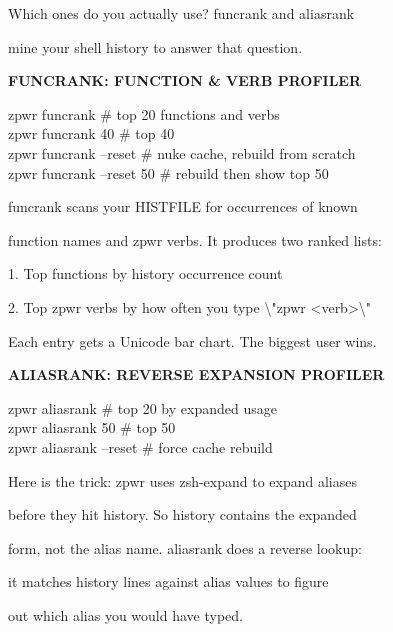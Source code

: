 \documentclass[11pt,a4paper,twoside]{book}
\begin{document}
Which ones do you actually use? funcrank and aliasrank

mine your shell history to answer that question.


\vspace{12pt}
{\bfseries\color{neonyellow} FUNCRANK: FUNCTION \& VERB PROFILER}\vspace{4pt}

\begin{codebox}
zpwr funcrank                       \# top 20 functions and verbs\\
zpwr funcrank 40                    \# top 40\\
zpwr funcrank --reset               \# nuke cache, rebuild from scratch\\
zpwr funcrank --reset 50            \# rebuild then show top 50\\
\end{codebox}

funcrank scans your HISTFILE for occurrences of known

function names and zpwr verbs. It produces two ranked lists:

1. Top functions by history occurrence count

2. Top zpwr verbs by how often you type \textbackslash{}"zpwr <verb>\textbackslash{}"

Each entry gets a Unicode bar chart. The biggest user wins.


\vspace{12pt}
{\bfseries\color{neonyellow} ALIASRANK: REVERSE EXPANSION PROFILER}\vspace{4pt}

\begin{codebox}
zpwr aliasrank                      \# top 20 by expanded usage\\
zpwr aliasrank 50                   \# top 50\\
zpwr aliasrank --reset              \# force cache rebuild\\
\end{codebox}

Here is the trick: zpwr uses zsh-expand to expand aliases

before they hit history. So history contains the expanded

form, not the alias name. aliasrank does a reverse lookup:

it matches history lines against alias values to figure

out which alias you would have typed.
\end{document}
